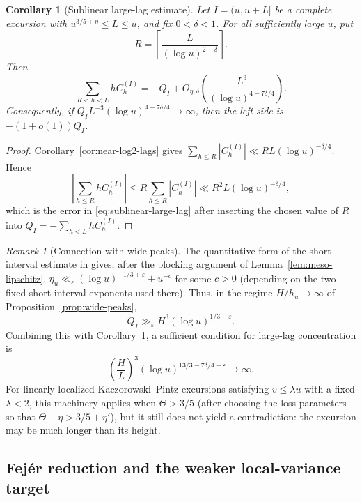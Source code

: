 \documentclass[11pt]{amsart}
\numberwithin{equation}{section}
\theoremstyle{plain}
\newtheorem{corollary}[theorem]{Corollary}
\theoremstyle{definition}
\theoremstyle{remark}
\newtheorem{remark}[theorem]{Remark}
\begin{document}
\begin{corollary}[Sublinear large-lag estimate]
\label{cor:sublinear-large-lag}
Let $I=(u,u+L]$ be a complete excursion with
$u^{3/5+\eta}\le L\le u$, and fix $0<\delta<1$.  For all sufficiently
large $u$, put
\[
R=\left\lceil\frac{L}{(\log u)^{2-\delta}}\right\rceil.
\]
Then
\begin{equation}
\label{eq:sublinear-large-lag}
\sum_{R<h<L}hC_h^{(I)}
=-Q_I+O_{\eta,\delta}\!\left(
\frac{L^3}{(\log u)^{4-7\delta/4}}
\right).
\end{equation}
Consequently, if
$Q_I L^{-3}(\log u)^{4-7\delta/4}\to\infty$, then the left side is
$-(1+o(1))Q_I$.
\end{corollary}

\begin{proof}
Corollary~\ref{cor:near-log2-lags} gives
$\sum_{h\le R}|C_h^{(I)}|\ll RL(\log u)^{-\delta/4}$. Hence
\[
\left|\sum_{h\le R}hC_h^{(I)}\right|
\le R\sum_{h\le R}|C_h^{(I)}|
\ll R^2L(\log u)^{-\delta/4},
\]
which is the error in \eqref{eq:sublinear-large-lag} after inserting the
chosen value of $R$ into $Q_I=-\sum_{h<L}hC_h^{(I)}$.
\end{proof}

\begin{remark}[Connection with wide peaks]
\label{rem:sublinear-wide-peaks}
The quantitative form of the short-interval estimate in
\cite[Theorem~1.1]{MatomakiTeravainen2023} gives, after the blocking argument
of Lemma~\ref{lem:meso-lipschitz},
$\eta_u\ll_\varepsilon(\log u)^{-1/3+\varepsilon}+u^{-c}$ for some $c>0$
(depending on the two fixed short-interval exponents used there). Thus, in
the regime $H/h_u\to\infty$ of Proposition~\ref{prop:wide-peaks},
\[
Q_I\gg_\varepsilon H^3(\log u)^{1/3-\varepsilon}.
\]
Combining this with Corollary~\ref{cor:sublinear-large-lag}, a sufficient
condition for large-lag concentration is
\[
\left(\frac HL\right)^3
(\log u)^{13/3-7\delta/4-\varepsilon}\longrightarrow\infty.
\]
For linearly localized Kaczorowski--Pintz excursions satisfying
$v\le\lambda u$ with a fixed $\lambda<2$, this machinery applies when
$\Theta>3/5$ (after choosing the loss parameters so that
$\Theta-\eta>3/5+\eta'$), but it still does not yield a contradiction: the
excursion may be much longer than its height.
\end{remark}

\subsection{Fej\'er reduction and the weaker local-variance target}
\end{document}
